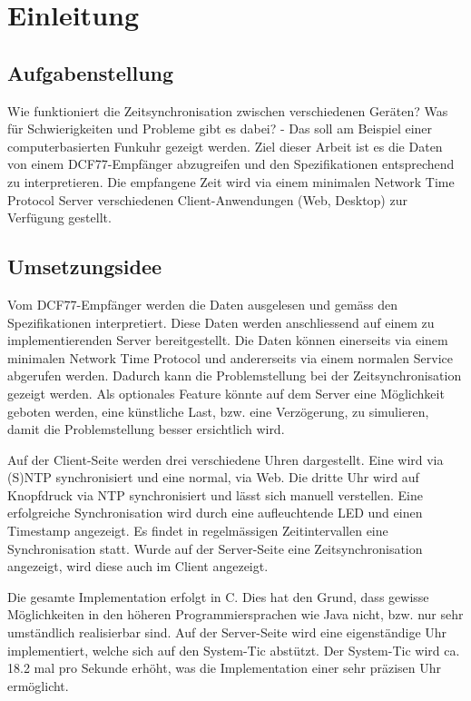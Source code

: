 
\chapter{Einleitung}



\section{Aufgabenstellung}

Wie funktioniert die Zeitsynchronisation zwischen verschiedenen Geräten? Was für Schwierigkeiten und Probleme gibt es dabei? - Das soll am Beispiel einer computerbasierten Funkuhr gezeigt werden. Ziel dieser Arbeit ist es die Daten von einem DCF77-Empfänger abzugreifen und den Spezifikationen entsprechend zu interpretieren. Die empfangene Zeit wird via einem minimalen Network Time Protocol Server verschiedenen Client-Anwendungen (Web, Desktop) zur Verfügung gestellt.

\section{Umsetzungsidee}

Vom DCF77-Empfänger werden die Daten ausgelesen und gemäss den Spezifikationen interpretiert. Diese Daten werden anschliessend auf einem zu implementierenden Server bereitgestellt. Die Daten können einerseits via einem minimalen Network Time Protocol und andererseits via einem normalen Service abgerufen werden. Dadurch kann die Problemstellung bei der Zeitsynchronisation gezeigt werden. Als optionales Feature könnte auf dem Server eine Möglichkeit geboten werden, eine künstliche Last, bzw. eine Verzögerung, zu simulieren, damit die Problemstellung besser ersichtlich wird.

Auf der Client-Seite werden drei verschiedene Uhren dargestellt. Eine wird via (S)NTP synchronisiert und eine normal, via Web. Die dritte Uhr wird auf Knopfdruck via NTP synchronisiert und lässt sich manuell verstellen. Eine erfolgreiche Synchronisation wird durch eine aufleuchtende LED und einen Timestamp angezeigt. Es findet in regelmässigen Zeitintervallen eine Synchronisation statt. Wurde auf der Server-Seite eine Zeitsynchronisation angezeigt, wird diese auch im Client angezeigt.

Die gesamte Implementation erfolgt in C. Dies hat den Grund, dass gewisse Möglichkeiten in den höheren Programmiersprachen wie Java nicht, bzw. nur sehr umständlich realisierbar sind. Auf der Server-Seite wird eine eigenständige Uhr implementiert, welche sich auf den System-Tic abstützt. Der System-Tic wird ca. 18.2 mal pro Sekunde erhöht, was die Implementation einer sehr präzisen Uhr ermöglicht. 
